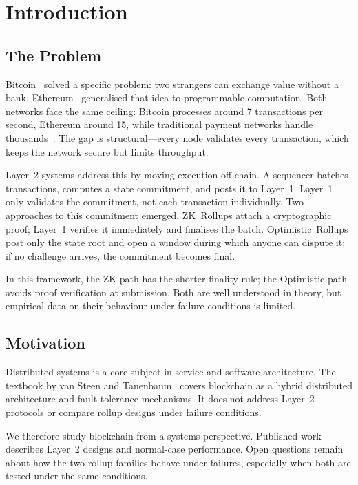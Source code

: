 \chapter{Introduction}
\label{ch:intro}

\section{The Problem}

Bitcoin~\cite{nakamoto2008bitcoin} solved a specific problem: two strangers can exchange value without a bank. Ethereum~\cite{wood2014ethereum} generalised that idea to programmable computation. Both networks face the same ceiling: Bitcoin processes around 7 transactions per second, Ethereum around 15, while traditional payment networks handle thousands~\cite{croman2016scaling}. The gap is structural---every node validates every transaction, which keeps the network secure but limits throughput.

Layer~2 systems address this by moving execution off-chain. A sequencer batches transactions, computes a state commitment, and posts it to Layer~1. Layer~1 only validates the commitment, not each transaction individually. Two approaches to this commitment emerged. ZK~Rollups attach a cryptographic proof; Layer~1 verifies it immediately and finalises the batch. Optimistic~Rollups post only the state root and open a window during which anyone can dispute it; if no challenge arrives, the commitment becomes final.

In this framework, the ZK path has the shorter finality rule; the Optimistic path avoids proof verification at submission. Both are well understood in theory, but empirical data on their behaviour under failure conditions is limited.

\section{Motivation}

Distributed systems is a core subject in service and software architecture. The textbook by van Steen and Tanenbaum~\cite{vansteen2023distributed} covers blockchain as a hybrid distributed architecture and fault tolerance mechanisms. It does not address Layer~2 protocols or compare rollup designs under failure conditions.

We therefore study blockchain from a systems perspective. Published work describes Layer~2 designs and normal-case performance. Open questions remain about how the two rollup families behave under failures, especially when both are tested under the same conditions.

